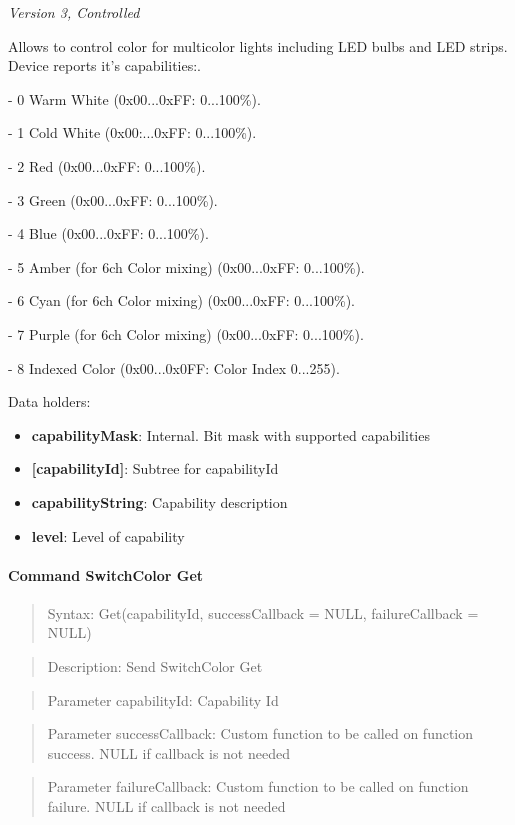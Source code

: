 \textit{Version 3, Controlled}
\newline

Allows to control color for multicolor lights including LED bulbs and LED strips. Device reports it's capabilities:. 

- 0 Warm White (0x00...0xFF: 0...100\%). 

- 1 Cold White (0x00:...0xFF: 0...100\%). 

- 2 Red (0x00...0xFF: 0...100\%). 

- 3 Green (0x00...0xFF: 0...100\%). 

- 4 Blue (0x00...0xFF: 0...100\%). 

- 5 Amber (for 6ch Color mixing) (0x00...0xFF: 0...100\%). 

- 6 Cyan (for 6ch Color mixing) (0x00...0xFF: 0...100\%). 

- 7 Purple (for 6ch Color mixing) (0x00...0xFF: 0...100\%). 

- 8 Indexed Color (0x00...0x0FF: Color Index 0...255).
\newline

\noindent
Data holders:

\begin{itemize}
\item \textbf{capabilityMask}: Internal. Bit mask with supported capabilities
\item \textbf{[capabilityId]}: Subtree for capabilityId
\item \qquad\textbf{capabilityString}: Capability description
\item \qquad\textbf{level}: Level of capability
\end{itemize}

\paragraph{Command SwitchColor Get}
\begin{quote}Syntax: Get(capabilityId, successCallback = NULL, failureCallback = NULL)\end{quote}
\begin{quote}Description: Send SwitchColor Get\end{quote}
\begin{quote}Parameter capabilityId: Capability Id\end{quote}
\begin{quote}Parameter successCallback: Custom function to be called on function success. NULL if callback is not needed\end{quote}
\begin{quote}Parameter failureCallback: Custom function to be called on function failure. NULL if callback is not needed\end{quote}


